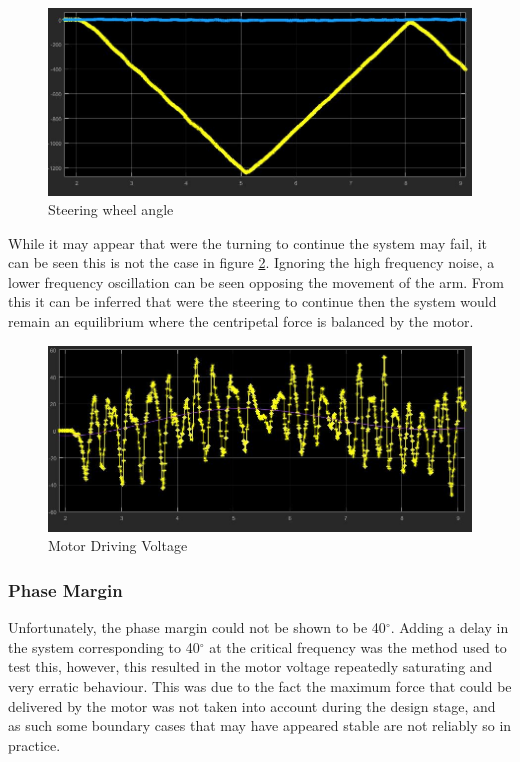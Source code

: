 \documentclass[11pt, a4paper,twocolumn]{article}
\begin{document}
	\begin{figure}[h!]
	\begin{center}
	\includegraphics[width=\linewidth]{SteeringWheels}
	\caption{Steering wheel angle}
	\label{fig:4.5}
	\end{center}
	\end{figure}
While it may appear that were the turning to continue the system may fail, it can be seen this is not the case in figure \ref{fig:4.6}. Ignoring the high frequency noise, a lower frequency oscillation can be seen opposing the movement of the arm. From this it can be inferred that were the steering to continue then the system would remain an equilibrium where the centripetal force is balanced by the motor.
	\begin{figure}[h!]
	\begin{center}
	\includegraphics[width=\linewidth]{SteeringVoltage}
	\caption{Motor Driving Voltage}
	\label{fig:4.6}
	\end{center}
	\end{figure}

            \subsubsection{Phase Margin}
Unfortunately, the phase margin could not be shown to be 40$^\circ$. Adding a delay in the system corresponding to 40$^\circ$ at the critical frequency was the method used to test this, however, this resulted in the motor voltage repeatedly saturating and very erratic behaviour. This was due to the fact the maximum force that could be delivered by the motor was not taken into account during the design stage, and as such some boundary cases that may have appeared stable are not reliably so in practice.
\end{document}
